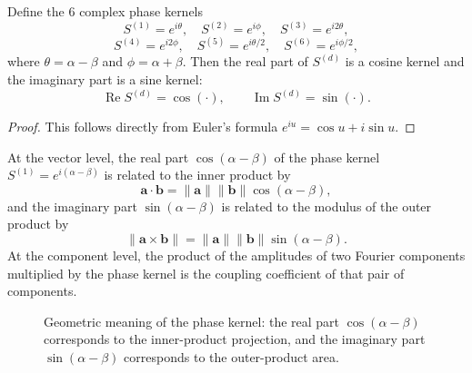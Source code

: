 \begin{proposition}\label{prop:twelve_to_six}
Define the 6 complex phase kernels
\[
S^{(1)} = e^{i\theta}, \quad S^{(2)} = e^{i\phi}, \quad S^{(3)} = e^{i2\theta},
\]
\[
S^{(4)} = e^{i2\phi}, \quad S^{(5)} = e^{i\theta/2}, \quad S^{(6)} = e^{i\phi/2},
\]
where $\theta = \alpha - \beta$ and $\phi = \alpha + \beta$. Then the real part of $S^{(d)}$ is a cosine kernel and the imaginary part is a sine kernel:
\[
\operatorname{Re} S^{(d)} = \cos(\cdot), \qquad \operatorname{Im} S^{(d)} = \sin(\cdot).
\]
\end{proposition}

\begin{proof}
This follows directly from Euler's formula $e^{iu} = \cos u + i\sin u$.
\end{proof}

\begin{remark}\label{rem:phase_kernel_inner_outer}
At the vector level, the real part $\cos(\alpha-\beta)$ of the phase kernel $S^{(1)} = e^{i(\alpha-\beta)}$ is related to the inner product by
\[
\mathbf{a} \cdot \mathbf{b} = \|\mathbf{a}\| \|\mathbf{b}\| \cos(\alpha - \beta),
\]
and the imaginary part $\sin(\alpha-\beta)$ is related to the modulus of the outer product by
\[
\|\mathbf{a} \times \mathbf{b}\| = \|\mathbf{a}\| \|\mathbf{b}\| \sin(\alpha - \beta).
\]
At the component level, the product of the amplitudes of two Fourier components multiplied by the phase kernel is the coupling coefficient of that pair of components.
\end{remark}

\begin{figure}[htbp]
\centering
{}
\caption{Geometric meaning of the phase kernel: the real part $\cos(\alpha-\beta)$ corresponds to the inner-product projection, and the imaginary part $\sin(\alpha-\beta)$ corresponds to the outer-product area.}
\label{fig:phase_kernel_geometry}
\end{figure}

